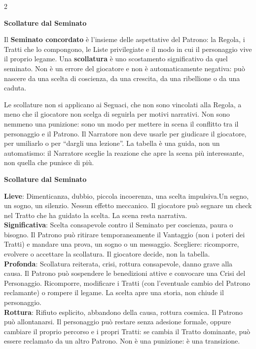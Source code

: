 \begin{multicols}{2}
\medskip

\textbf{Scollature dal Seminato}

Il \textbf{Seminato concordato} è l'insieme delle aspettative del Patrono: la Regola, i Tratti che lo compongono, le Liste privilegiate e il modo in cui il personaggio vive il proprio legame. Una \textbf{scollatura} è uno scostamento significativo da quel seminato. Non è un errore del giocatore e non è automaticamente negativa: può nascere da una scelta di coscienza, da una crescita, da una ribellione o da una caduta.

Le scollature non si applicano ai Seguaci, che non sono vincolati alla Regola, a meno che il giocatore non scelga di seguirla per motivi narrativi. Non sono nemmeno una punizione: sono un modo per mettere in scena il conflitto tra il personaggio e il Patrono. Il Narratore non deve usarle per giudicare il giocatore, per umiliarlo o per ``dargli una lezione''. La tabella è una guida, non un automatismo: il Narratore sceglie la reazione che apre la scena più interessante, non quella che punisce di più.

\medskip


\textbf{Scollature dal Seminato}

\medskip

\textbf{Lieve}: Dimenticanza, dubbio, piccola incoerenza, una scelta impulsiva.Un segno, un sogno, un silenzio. Nessun effetto meccanico.  Il giocatore può segnare un check nel Tratto che ha guidato la scelta. La scena resta narrativa.\\

\textbf{Significativa}: Scelta consapevole contro il Seminato per coscienza, paura o bisogno. Il Patrono può ritirare temporaneamente il Vantaggio (non i poteri dei Tratti) e mandare una prova, un sogno o un messaggio.  Scegliere: ricomporre, evolvere o accettare la scollatura. Il giocatore decide, non la tabella.\\

\textbf{Profonda}: Scollatura reiterata, crisi, rottura consapevole, danno grave alla causa. Il Patrono può sospendere le benedizioni attive e convocare una Crisi del Personaggio. Ricomporre, modificare i Tratti (con l'eventuale cambio del Patrono reclamante) o rompere il legame. La scelta apre una storia, non chiude il personaggio.\\

\textbf{Rottura}: Rifiuto esplicito, abbandono della causa, rottura cosmica. Il Patrono può allontanarsi. Il personaggio può restare senza adesione formale, oppure cambiare il proprio percorso e i propri Tratti: se cambia il Tratto dominante, può essere reclamato da un altro Patrono. Non è una punizione: è una transizione.\\


\end{multicols}
